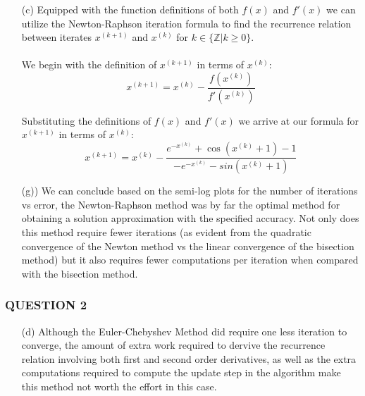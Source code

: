 \documentclass{article}
\begin{document}
\begin{enumerate}
    
    \item[(c)]  Equipped with the function definitions of both $f(x)$ and $f'(x)$ we can utilize the Newton-Raphson iteration formula
                to find the recurrence relation between iterates $x^{(k+1)}$ and $x^{(k)}$ for $k\in\{\mathbb{Z}|k \geq 0\}$.\\\\

                We begin with the definition of $x^{(k+1)}$ in terms of $x^{(k)}$:
                \begin{equation}
                    x^{(k+1)} = x^{(k)}-\frac{f(x^{(k)})}{f'(x^{(k)})}
                \end{equation}

                Substituting the definitions of $f(x)$ and $f'(x)$ we arrive at our formula for $x^{(k+1)}$ in terms of $x^{(k)}$:
                \begin{equation}
                    x^{(k+1)} = x^{(k)} - \frac { e^{-x^{(k)}}+\cos(x^{(k)}+1)-1} {-e^{-x^{(k)}}-sin(x^{(k)}+1)}
                \end{equation}
    
    \item[(g))] We can conclude based on the semi-log plots for the number of iterations vs error, the Newton-Raphson method was by
                far the optimal method for obtaining a solution approximation with the specified accuracy. Not only does this method
                require fewer iterations (as evident from the quadratic convergence of the Newton method vs the linear convergence
                of the bisection method) but it also requires fewer computations per iteration when compared with the bisection method.
\end{enumerate}
\vspace{10pt}
\subsubsection*{QUESTION 2}

\begin{enumerate}


    \item[(d)] Although the  Euler-Chebyshev Method did require one less iteration to converge, the amount of extra work required
               to dervive the recurrence relation involving both first and second order derivatives, as well as the extra computations
               required to compute the update step in the algorithm make this method not worth the effort in this case.

\end{enumerate}
\vspace{10pt}
\end{document}
